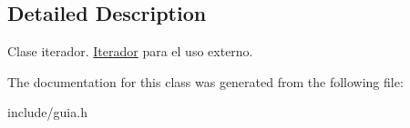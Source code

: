 \subsection{Detailed Description}
Clase iterador. \hyperlink{classGuia__Tlf_1_1Iterador}{Iterador} para el uso externo. 

The documentation for this class was generated from the following file\+:\begin{DoxyCompactItemize}
\item 
include/guia.\+h\end{DoxyCompactItemize}
